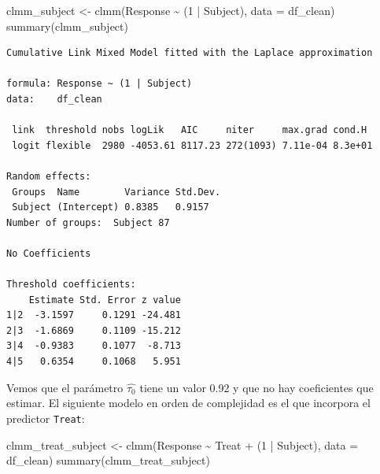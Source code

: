\documentclass[
  12pt,
  a4paper,
  extrafontsizes,
  onecolumn,
  openright]{memoir}
\newenvironment{Shaded}{\begin{snugshade}}{\end{snugshade}}
\newcommand{\AttributeTok}[1]{\textcolor[rgb]{0.40,0.45,0.13}{#1}}
\newcommand{\DecValTok}[1]{\textcolor[rgb]{0.68,0.00,0.00}{#1}}
\newcommand{\FunctionTok}[1]{\textcolor[rgb]{0.28,0.35,0.67}{#1}}
\newcommand{\NormalTok}[1]{\textcolor[rgb]{0.00,0.23,0.31}{#1}}
\newcommand{\OtherTok}[1]{\textcolor[rgb]{0.00,0.23,0.31}{#1}}
\newcommand{\SpecialCharTok}[1]{\textcolor[rgb]{0.37,0.37,0.37}{#1}}
\begin{document}
\scriptsize

\begin{Shaded}
\begin{Highlighting}[]
\NormalTok{clmm\_subject }\OtherTok{\textless{}{-}} \FunctionTok{clmm}\NormalTok{(Response }\SpecialCharTok{\textasciitilde{}}\NormalTok{ (}\DecValTok{1} \SpecialCharTok{|}\NormalTok{ Subject), }\AttributeTok{data =}\NormalTok{ df\_clean)}
\FunctionTok{summary}\NormalTok{(clmm\_subject)}
\end{Highlighting}
\end{Shaded}

\begin{verbatim}
Cumulative Link Mixed Model fitted with the Laplace approximation

formula: Response ~ (1 | Subject)
data:    df_clean

 link  threshold nobs logLik   AIC     niter     max.grad cond.H 
 logit flexible  2980 -4053.61 8117.23 272(1093) 7.11e-04 8.3e+01

Random effects:
 Groups  Name        Variance Std.Dev.
 Subject (Intercept) 0.8385   0.9157  
Number of groups:  Subject 87 

No Coefficients

Threshold coefficients:
    Estimate Std. Error z value
1|2  -3.1597     0.1291 -24.481
2|3  -1.6869     0.1109 -15.212
3|4  -0.9383     0.1077  -8.713
4|5   0.6354     0.1068   5.951
\end{verbatim}

\normalsize

Vemos que el parámetro \(\widehat{\tau_0}\) tiene un valor 0.92 y que no
hay coeficientes que estimar. El siguiente modelo en orden de
complejidad es el que incorpora el predictor \texttt{Treat}:

\scriptsize

\begin{Shaded}
\begin{Highlighting}[]
\NormalTok{clmm\_treat\_subject }\OtherTok{\textless{}{-}} \FunctionTok{clmm}\NormalTok{(Response }\SpecialCharTok{\textasciitilde{}}\NormalTok{ Treat }\SpecialCharTok{+}\NormalTok{ (}\DecValTok{1} \SpecialCharTok{|}\NormalTok{ Subject), }\AttributeTok{data =}\NormalTok{ df\_clean)}
\FunctionTok{summary}\NormalTok{(clmm\_treat\_subject)}
\end{Highlighting}
\end{Shaded}
\end{document}
